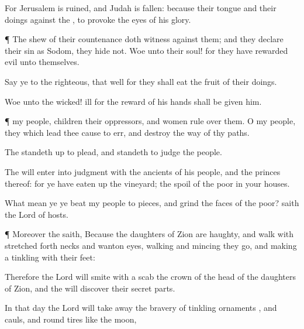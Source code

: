 {For
Jerusalem is
ruined, and
Judah is
fallen: because their
tongue and their
doings
{} against the
{}, to
provoke the
eyes of his
glory.


\par }{\PP {}¶ The
shew of their
countenance doth witness against
them; and they
declare their
sin as
Sodom, they
hide
{} not.
Woe unto their
soul! for they have
rewarded
evil unto themselves.

Say ye to the
righteous, that
{}
well
{} for they shall
eat the
fruit of their
doings.

Woe unto the
wicked!
{}
ill
{} for the
reward of his
hands shall be
given him.


\par }{\PP {}¶
{} my
people,
children
{} their
oppressors, and
women
rule over them. O my
people, they which
lead thee cause
{} to
err, and
destroy the
way of thy
paths.

The
{} standeth
up to
plead, and
standeth to
judge the
people.

The
{} will
enter into
judgment with the
ancients of his
people, and the
princes thereof: for ye have eaten
up the
vineyard; the
spoil of the
poor
{} in your
houses.

What mean ye
{} ye
beat my
people to
pieces, and
grind the
faces of the
poor?
saith the
Lord
{} of
hosts.


\par }{\PP {}¶ Moreover the
{}
saith,
Because the
daughters of
Zion are
haughty, and
walk with stretched
forth
necks and
wanton
eyes,
walking and
mincing
{} they
go, and making a
tinkling with their
feet:

Therefore the
Lord will smite with a
scab the crown of the
head of the
daughters of
Zion, and the
{} will
discover their secret
parts.

In that
day the
Lord will take
away the
bravery of
{} tinkling
ornaments
{}, and
{}
cauls, and
{} round tires like the
moon,

}
